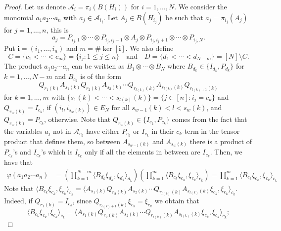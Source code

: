 \documentclass[a4paper,12pt]{extarticle}
\theoremstyle{definition}
\theoremstyle{remark}
\def\AA{\mathcal{A}}
\begin{document}
\begin{proof}
	Let us denote $\AA_i=\pi_i(B(H_i))$ for $i=1,\ldots, N$. 
	We consider the monomial $a_1a_2\cdots a_n$ with $a_j\in \AA_{i_j}$. 
	Let $A_j\in B(H_{i_j})$ be such that $a_j=\pi_{i_j}(A_j)$ for $j=1,\ldots, n$, this is 
	\[ 
	a_j=P_{i_j,1}\otimes \cdots \otimes P_{i_j, i_j-1}\otimes A_j \otimes P_{i_j,i_j+1}\otimes \cdots \otimes P_{i_j,N}.
	\]
	Put $\bm{i}=(i_1,\ldots, i_n)$ and $m=\#\ker[\bm{i}]$. 
	We also define 
	\[ 
	C=\{c_1<\cdots<c_m\}=\{i_j:1\leq j \leq n\} \quad \text{and} \quad D=\{d_1<\cdots<d_{N-m}\}=[N]\setminus C.
	\]
	The product $a_1a_2\cdots a_n$ can be written as $B_1\otimes \cdots \otimes B_N$ where $B_{d_k}\in \{I_{d_k},P_{d_k}\}$ for $k=1,\ldots, N-m$ and $B_{c_k}$ is of the form
	\[
	Q_{r_1(k)}A_{s_1(k)}Q_{r_2(k)}A_{s_2(k)}\cdots Q_{r_{l(k)}(k)}A_{s_{l(k)}(k)}Q_{r_{l(k)+1}(k)}
	\]
	for $k=1,\ldots,m$ with $\{s_1(k)<\cdots<s_{l(k)}(k)\}=\{j\in [n]: i_j=c_k\}$
	and $Q_{r_w(k)}=I_{c_k}$, if  $(i_l,i_{s_{w}(k)})\in E_N$ for all $s_{w-1}(k)<l<s_{w}(k)$, and $Q_{r_w(k)}=P_{c_k}$, otherwise. 
	Note that $Q_{r_w(k)}\in \{I_{c_k},P_{c_k}\}$ comes from the fact that the variables $a_j$ not in $\AA_{c_k}$ have either $P_{c_k}$ or $I_{c_k}$ in their $c_k$-term in the tensor product that defines them, so between $A_{s_{w-1}(k)}$ and $A_{s_{w}(k)}$ there is a product of $P_{c_k}$'s and $I_{c_k}$'s which is $I_{c_k}$ only if all the elements in between are $I_{c_k}$.
	Then, we have that
	\begin{align*}
		\varphi(a_1a_2\cdots a_n)%
		&=\left(\prod_{k=1}^{N-m}\langle B_{d_k} \xi_{d_k},\xi_{d_k}\rangle_{d_k}\right)\left(\prod_{k=1}^{m}\langle B_{c_k} \xi_{c_k},\xi_{c_k}\rangle_{c_k}\right)=\prod_{k=1}^{m}\langle B_{c_k} \xi_{c_k},\xi_{c_k}\rangle_{c_k}
	\end{align*}
	Note that $\langle B_{c_k} \xi_{c_k},\xi_{c_k}\rangle_{c_k}=\langle A_{s_1(k)}Q_{r_2(k)}A_{s_2(k)}\cdots Q_{r_{l(k)}(k)}A_{s_{l(k)}(k)} \xi_{c_k},\xi_{c_k}\rangle_{c_k}$.
	Indeed, if $Q_{r_1(k)}=I_{c_k}$, since $Q_{r_{l(k)+1}(k)} \xi_{c_k}=\xi_{c_k}$ we obtain that 
	\[\langle B_{c_k} \xi_{c_k},\xi_{c_k}\rangle_{c_k}=\langle A_{s_1(k)}Q_{r_2(k)}A_{s_2(k)}\cdots Q_{r_{l(k)}(k)}A_{s_{l(k)}(k)} \xi_{c_k},\xi_{c_k}\rangle_{c_k}; \]

\end{proof}
\end{document}
